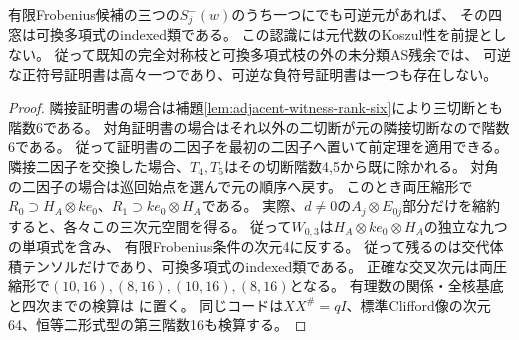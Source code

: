 \begin{corollary}[単一負符号証明書の認識]\label{cor:one-negative-frobenius-recognition}
有限Frobenius候補の三つの$S_j^-(w)$のうち一つにでも可逆元があれば、
その四窓は可換多項式のindexed類である。
この認識には元代数のKoszul性を前提としない。
従って既知の完全対称枝と可換多項式枝の外の未分類AS残余では、
可逆な正符号証明書は高々一つであり、可逆な負符号証明書は一つも存在しない。
\end{corollary}
\begin{proof}
隣接証明書の場合は補題\ref{lem:adjacent-witness-rank-six}により三切断とも階数6である。
対角証明書の場合はそれ以外の二切断が元の隣接切断なので階数6である。
従って証明書の二因子を最初の二因子へ置いて前定理を適用できる。
隣接二因子を交換した場合、$T_4,T_5$はその切断階数4,5から既に除かれる。
対角の二因子の場合は巡回始点を選んで元の順序へ戻す。
このとき両圧縮形で$R_0\supset H_A\otimes ke_0$、$R_1\supset ke_0\otimes H_A$である。
実際、$d\ne0$の$A_j\otimes E_{0j}$部分だけを縮約すると、各々この三次元空間を得る。
従って$W_{0,3}$は$H_A\otimes ke_0\otimes H_A$の独立な九つの単項式を含み、
有限Frobenius条件の次元4に反する。
従って残るのは交代体積テンソルだけであり、可換多項式のindexed類である。
正確な交叉次元は両圧縮形で$(10,16),(8,16),(10,16),(8,16)$となる。
有理数の関係・全核基底と四次までの検算は
に置く。
同じコードは$XX^\#=qI$、標準Clifford像の次元64、恒等二形式型の第三階数16も検算する。
\end{proof}
